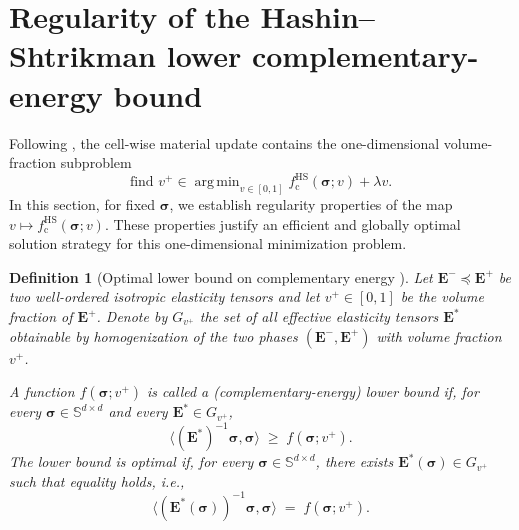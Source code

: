 \documentclass[preprint,3p]{elsarticle}
\newcommand{\tenss}[1]{\bm{\mathbf{#1}}}            %
\newcommand{\tensf}[1]{\bm{\mathbf{#1}}}            %
\newcommand{\stress}{\tenss{\sigma}}                %
\newcommand{\Emin}{\tensf{E}^{-}}                   %
\newcommand{\Emax}{\tensf{E}^{+}}                   %
\newcommand{\Estar}{\tensf{E}^{*}}
\DeclareMathOperator*{\argmin}{arg\,min}
\newtheorem{definition}{Definition}[section]
\begin{document}
\section{Regularity of the Hashin--Shtrikman lower complementary-energy bound}\label{appendix:rederivation_burzain}

Following \citet{Burazin2021}, the cell-wise material update contains the one-dimensional volume-fraction subproblem
%
\begin{equation}
    \text{find } v^{+}\in\argmin_{v\in[0,1]} f_{\mathrm{c}}^{\mathrm{HS}}(\stress;v)+\lambda v.
\end{equation}
%
In this section, for fixed $\stress$, we establish regularity properties of the map $v\mapsto f_{\mathrm{c}}^{\mathrm{HS}}(\stress;v)$. These properties justify an efficient and globally optimal solution strategy for this one-dimensional minimization problem.

\begin{definition}[Optimal lower bound on complementary energy {\citep[Definition~2.3.15]{Allaire2002}}]\label{def:lower_bound}
    Let $\Emin \preceq \Emax$ be two well-ordered isotropic elasticity tensors and let $v^+\in[0,1]$ be the volume fraction of $\Emax$. Denote by $G_{v^+}$ the set of all effective elasticity tensors $\Estar$ obtainable by homogenization of the two phases $(\Emin,\Emax)$ with volume fraction $v^+$.

    A function $f(\stress;v^+)$ is called a (complementary-energy) lower bound if, for every $\stress\in\mathbb{S}^{d\times d}$ and every $\Estar\in G_{v^+}$,
    \[
    \langle (\Estar)^{-1}\stress,\stress\rangle \;\ge\; f(\stress;v^+).
    \]
    The lower bound is optimal if, for every $\stress\in\mathbb{S}^{d\times d}$, there exists $\Estar(\stress)\in G_{v^+}$ such that equality holds, i.e.,
    \[
    \langle (\Estar(\stress))^{-1}\stress,\stress\rangle \;=\; f(\stress;v^+).
    \]
\end{definition}
\end{document}
